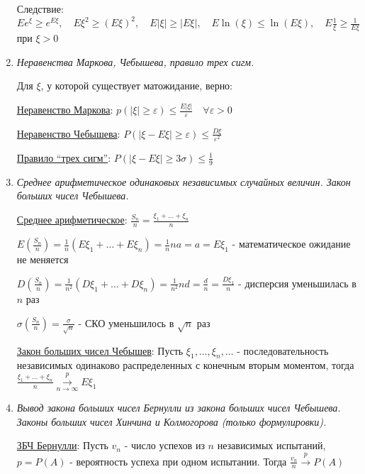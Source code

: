 \begin{enumerate}
    Следствие: $Ee^\xi \geq e^{E\xi}, \quad E\xi^2 \geq (E\xi)^2, \quad E|\xi| \geq |E\xi|, \quad E\ln(\xi) \leq \ln(E\xi), \quad E\frac{1}{\xi} \geq \frac{1}{E\xi}$ при $\xi > 0$

    \item \textit{Неравенства Маркова, Чебышева, правило трех сигм.}

    Для $\xi$, у которой существует матожидание, верно: 

    \hyperlink{markovsinequality}{Неравенство Маркова}: \Ths $p(|\xi| \geq \varepsilon) \leq \frac{E|\xi|}{\varepsilon} \quad \forall \varepsilon > 0$
    
    \hyperlink{chebyshevsinequality}{Неравенство Чебышева}: \Ths $P(|\xi - E\xi| \geq \varepsilon) \leq \frac{D\xi}{\varepsilon^2}$
    
    \hyperlink{ruleofthreesigmas}{Правило \enquote{трех сигм}}: \Ths $P(|\xi - E\xi| \geq 3\sigma) \leq \frac{1}{9}$

    \item \textit{Среднее арифметическое одинаковых независимых случайных величин. Закон больших чисел Чебышева.}

    \hyperlink{averagevalueofrandomvariables}{Среднее арифметическое}: $\frac{S_n}{n} = \frac{\xi_1 + \dots + \xi_n}{n}$

    $E\left(\frac{S_n}{n}\right) = \frac{1}{n} (E\xi_1 + \dots + E\xi_n) = \frac{1}{n} na = a = E\xi_1$ - математическое ожидание не меняется

    $D\left(\frac{S_n}{n}\right) = \frac{1}{n^2} (D\xi_1 + \dots + D\xi_n) = \frac{1}{n^2} nd = \frac{d}{n} = \frac{D\xi_1}{n}$ - дисперсия уменьшилась в $n$ раз

    $\sigma\left(\frac{S_n}{n}\right) = \frac{\sigma}{\sqrt{n}}$ - СКО уменьшилось в $\sqrt{n}$ раз

    \hyperlink{lawofbignumberschebyshev}{Закон больших чисел Чебышев}: \Ths Пусть $\xi_1, \dots, \xi_n, \dots$ - последовательность независимых одинаково распределенных с конечным вторым моментом,
    тогда $\frac{\xi_1 + \dots + \xi_n}{n} \overset{p}{\underset{n \to \infty}{\longrightarrow}} E\xi_1$

    \item \textit{Вывод закона больших чисел Бернулли из закона больших чисел Чебышева. Законы больших чисел Хинчина и Колмогорова (только формулировки).}

    \hyperlink{lawofbignumbersbernoulli2}{ЗБЧ Бернулли}: \Ths Пусть $v_n$ - число успехов из $n$ независимых испытаний, $p = P(A)$ - вероятность успеха при одном испытании.
    Тогда $\frac{v_n}{n} \overset{p}{\longrightarrow} P(A)$


\end{enumerate}
